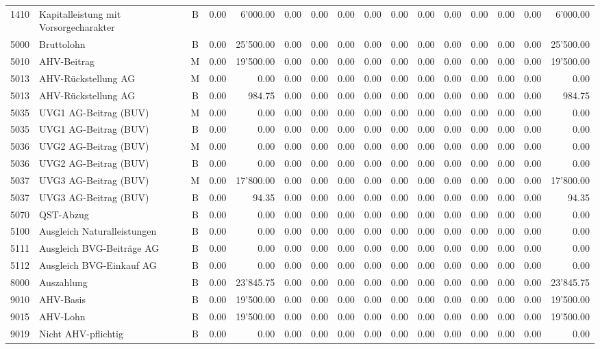 \documentclass[8pt,a4paper]{extarticle}
\begin{document}
\begin{longtable}{@{\extracolsep{\fill}} l l c r r r r r r r r r r r r r}
1410&Kapitalleistung mit Vorsorgecharakter&B&0.00&6'000.00&0.00&0.00&0.00&0.00&0.00&0.00&0.00&0.00&0.00&0.00&6'000.00\\
5000&Bruttolohn&B&0.00&25'500.00&0.00&0.00&0.00&0.00&0.00&0.00&0.00&0.00&0.00&0.00&25'500.00\\
5010&AHV-Beitrag&M&0.00&19'500.00&0.00&0.00&0.00&0.00&0.00&0.00&0.00&0.00&0.00&0.00&19'500.00\\
5013&AHV-Rückstellung AG&M&0.00&0.00&0.00&0.00&0.00&0.00&0.00&0.00&0.00&0.00&0.00&0.00&0.00\\
5013&AHV-Rückstellung AG&B&0.00&984.75&0.00&0.00&0.00&0.00&0.00&0.00&0.00&0.00&0.00&0.00&984.75\\
5035&UVG1 AG-Beitrag (BUV)&M&0.00&0.00&0.00&0.00&0.00&0.00&0.00&0.00&0.00&0.00&0.00&0.00&0.00\\
5035&UVG1 AG-Beitrag (BUV)&B&0.00&0.00&0.00&0.00&0.00&0.00&0.00&0.00&0.00&0.00&0.00&0.00&0.00\\
5036&UVG2 AG-Beitrag (BUV)&M&0.00&0.00&0.00&0.00&0.00&0.00&0.00&0.00&0.00&0.00&0.00&0.00&0.00\\
5036&UVG2 AG-Beitrag (BUV)&B&0.00&0.00&0.00&0.00&0.00&0.00&0.00&0.00&0.00&0.00&0.00&0.00&0.00\\
5037&UVG3 AG-Beitrag (BUV)&M&0.00&17'800.00&0.00&0.00&0.00&0.00&0.00&0.00&0.00&0.00&0.00&0.00&17'800.00\\
5037&UVG3 AG-Beitrag (BUV)&B&0.00&94.35&0.00&0.00&0.00&0.00&0.00&0.00&0.00&0.00&0.00&0.00&94.35\\
5070&QST-Abzug&B&0.00&0.00&0.00&0.00&0.00&0.00&0.00&0.00&0.00&0.00&0.00&0.00&0.00\\
5100&Ausgleich Naturalleistungen&B&0.00&0.00&0.00&0.00&0.00&0.00&0.00&0.00&0.00&0.00&0.00&0.00&0.00\\
5111&Ausgleich BVG-Beiträge AG&B&0.00&0.00&0.00&0.00&0.00&0.00&0.00&0.00&0.00&0.00&0.00&0.00&0.00\\
5112&Ausgleich BVG-Einkauf AG&B&0.00&0.00&0.00&0.00&0.00&0.00&0.00&0.00&0.00&0.00&0.00&0.00&0.00\\
8000&Auszahlung&B&0.00&23'845.75&0.00&0.00&0.00&0.00&0.00&0.00&0.00&0.00&0.00&0.00&23'845.75\\
9010&AHV-Basis&B&0.00&19'500.00&0.00&0.00&0.00&0.00&0.00&0.00&0.00&0.00&0.00&0.00&19'500.00\\
9015&AHV-Lohn&B&0.00&19'500.00&0.00&0.00&0.00&0.00&0.00&0.00&0.00&0.00&0.00&0.00&19'500.00\\
9019&Nicht AHV-pflichtig&B&0.00&0.00&0.00&0.00&0.00&0.00&0.00&0.00&0.00&0.00&0.00&0.00&0.00\\

\end{longtable}
\end{document}
